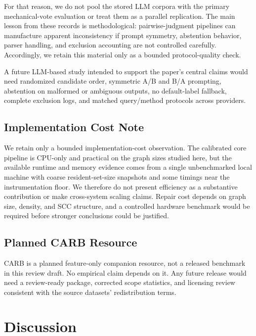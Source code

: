 \documentclass[manuscript,anonymous,review]{acmart}
\begin{document}
For that reason, we do not pool the stored LLM corpora with the primary
mechanical-vote evaluation or treat them as a parallel replication. The main
lesson from these records is methodological: pairwise-judgment pipelines can
manufacture apparent inconsistency if prompt symmetry, abstention behavior,
parser handling, and exclusion accounting are not controlled carefully.
Accordingly, we retain this material only as a bounded protocol-quality check.

A future LLM-based study intended to support the paper's central claims would
need randomized candidate order, symmetric A/B and B/A prompting, abstention on
malformed or ambiguous outputs, no default-label fallback, complete exclusion
logs, and matched query/method protocols across providers.

\subsection{Implementation Cost Note}
\label{sec:efficiency}

We retain only a bounded implementation-cost observation. The calibrated core
pipeline is CPU-only and practical on the graph sizes studied here, but the
available runtime and memory evidence comes from a single unbenchmarked local
machine with coarse resident-set-size snapshots and some timings near the
instrumentation floor. We therefore do not present efficiency as a substantive
contribution or make cross-system scaling claims. Repair cost depends on graph
size, density, and SCC structure, and a controlled hardware benchmark would be
required before stronger conclusions could be justified.

\subsection{Planned CARB Resource}
\label{sec:carb}

CARB is a planned feature-only companion resource, not a released benchmark in
this review draft. No empirical claim depends on it. Any future release would
need a review-ready package, corrected scope statistics, and licensing review
consistent with the source datasets' redistribution terms.

\section{Discussion}
\label{sec:discussion}
\end{document}
